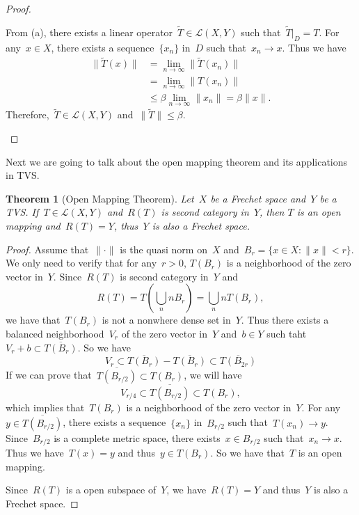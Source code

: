 \documentclass[12pt,a4paper,draft]{article}  %
\newtheorem{theorem}{Theorem}[section]
\theoremstyle{definition}
\numberwithin{equation}{section}
\begin{document}
\begin{proof}
\begin{enumerate}
        From (a), there exists a linear operator~$\tilde{T} \in \mathcal{L}(X,Y)$ such that~$\tilde{T}|_D = T$.
        For any~$x \in X$, there exists a sequence~$\{x_n\}$ in~$D$ such that~$x_n \rightarrow x$.
        Thus we have 
        \begin{align}
            \|\tilde{T}(x)\| & = \lim_{n \rightarrow \infty} \|\tilde{T}(x_n)\| \nonumber \\
            & = \lim_{n \rightarrow \infty} \|T(x_n)\| \nonumber \\
            & \leq \beta \lim_{n \rightarrow \infty} \|x_n\| = \beta\|x\|. \nonumber
        \end{align}
        Therefore,~$\tilde{T} \in \mathcal{L}(X,Y)$ and~$\|\tilde{T}\| \leq \beta$.
    \end{enumerate}
\end{proof}

Next we are going to talk about the open mapping theorem and its applications in TVS.
\begin{theorem}[Open Mapping Theorem]
    Let~$X$ be a Frechet space and~$Y$ be a TVS.
    If~$T \in \mathcal{L}(X,Y)$ and~$R(T)$ is second category in~$Y$, then 
    $T$ is an open mapping and~$R(T)=Y$, thus~$Y$ is also a Frechet space.
\end{theorem}
\begin{proof}
    Assume that~$\|\cdot \|$ is the quasi norm on~$X$ and~$B_r= \{x \in X: \|x\| < r\}$.
    We only need to verify that for any~$r > 0$, $T(B_r)$ is a neighborhood of the zero vector in~$Y$.
    Since~$R(T)$ is second category in~$Y$ and 
    $$ R(T)=T(\bigcup_n n B_r )=\bigcup_n n T(B_r ), $$
    we have that~$T(B_r)$ is not a nonwhere dense set in~$Y$.
    Thus there exists a balanced neighborhood~$V_r$ of the zero vector in~$Y$ and~$b \in Y$
    such taht $V_r + b \subset \overline{T(B_r)}$.
    So we have 
    $$ V_r \subset \overline{T(B_r)}-\overline{T(B_r)} \subset \overline{T(B_{2r})} $$
    If we can prove that~$\overline{T(B_{r/2})} \subset T(B_r)$, we will have
    $$ V_{r/4} \subset \overline{T(B_{r/2})} \subset T(B_r), $$
    which implies that~$T(B_r)$ is a neighborhood of the zero vector in~$Y$.
    For any~$y \in \overline{T(B_{r/2})}$, there exists a sequence~$\{x_n\}$ in~$B_{r/2}$ such that~$T(x_n) \rightarrow y$.
    Since~$B_{r/2}$ is a complete metric space, there exists~$x \in B_{r/2}$ such that~$x_n \rightarrow x$.
    Thus we have~$T(x)=y$ and thus~$y \in T(B_r)$.
    So we have that~$T$ is an open mapping.

    Since~$R(T)$ is a open subspace of~$Y$, we have~$R(T)=Y$ and thus~$Y$ is also a Frechet space.
\end{proof}
\end{document}
